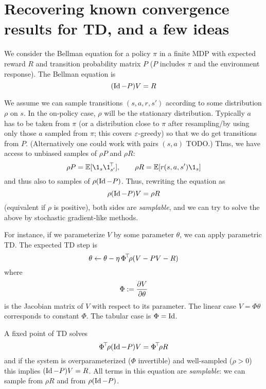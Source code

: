\documentclass[11pt,a4paper]{article}
\begin{document}
\section{Recovering known convergence results for TD, and a few ideas}

We consider the Bellman equation for a policy $\pi$ in a finite MDP with
expected reward $R$ and transition probability matrix $P$ ($P$ includes $\pi$ and
the environment response). The Bellman equation is
\begin{equation}
(\operatorname{Id}-P)V=R
\end{equation}

We assume we can sample transitions $(s,a,r,s')$ according to some
distribution $\rho$ on $s$. In the on-policy case, $\rho$ will be the
stationary distribution. Typically $a$ has to be taken from $\pi$ (or a
distribution close to $\pi$ after resampling/by using only those $a$
sampled from $\pi$; this covers $\varepsilon$-greedy) so that we do get
transitions from
$P$. (Alternatively one could work with pairs $(s,a)$ TODO.) Thus, we
have access to unbiased samples of $\rho P$ and $\rho R$:
\begin{equation}
\rho P=\E[\1_{s}\transp{\1_{s'}}\,],\qquad \rho R=\E[r(s,a,s')\1_{s}]
\end{equation}
and thus also to samples of $\rho(\operatorname{Id}-P)$. Thus, rewriting the equation
as
\begin{equation}
\rho(\operatorname{Id}-P)V=\rho R
\end{equation}
(equivalent if $\rho$ is positive), both sides are \emph{samplable}, and we can try to solve the above by
stochastic gradient-like methods.

For instance, if we parameterize $V$ by some parameter $\theta$, we can apply
parametric TD. The expected TD step is
\begin{equation}
\theta\gets \theta -\eta \,\Phi^{\!\top}\!\rho (V-PV-R)
\end{equation}
where 
\begin{equation}
\Phi\mathrel{\mathop{:}}= \frac{\partial V}{\partial \theta}
\end{equation}
is the Jacobian matrix of $V$ with respect to its parameter. The linear
case $V=\Phi \theta$ corresponds to constant $\Phi$. The tabular case is
$\Phi=\operatorname{Id}$.

A fixed point of TD solves
\begin{equation}
\Phi^{\!\top}\!\rho(\operatorname{Id}-P)V=\Phi^{\!\top}\!\rho R
\end{equation}
and if the system is overparameterized ($\Phi$ invertible) and
well-sampled ($\rho>0$) this implies $(\operatorname{Id}-P)V=R$. All terms in this
equation are \emph{samplable}: we can sample from $\rho R$ and from
$\rho(\operatorname{Id}-P)$.
\end{document}
